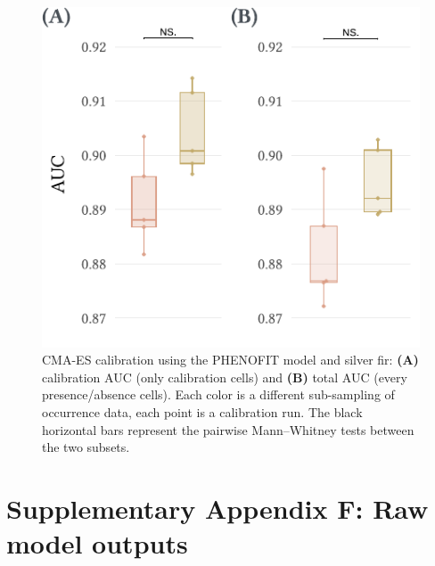 \documentclass[11pt,]{article}
\begin{document}
\begin{figure}[H]

{\centering \includegraphics{figs/calibCMAESabies} 

}

\caption{CMA-ES calibration using the PHENOFIT model and silver fir: \textbf{(A)} calibration AUC (only calibration cells) and \textbf{(B)} total AUC (every presence/absence cells). Each color is a different sub-sampling of occurrence data, each point is a calibration run. The black horizontal bars represent the pairwise Mann–Whitney tests between the two subsets.}\label{fig:calibCMAESabies}
\end{figure}

\newpage

\hypertarget{appendixF}{%
\section{Supplementary Appendix F: Raw model outputs}\label{appendixF}}

\renewcommand*\thetable{F.\arabic{table}}
\renewcommand*\thefigure{F.\arabic{figure}}

\setcounter{figure}{0}
\setcounter{table}{0}

\renewcommand*{\thepage}{F--\arabic{page}}

\hfill \break
\end{document}
